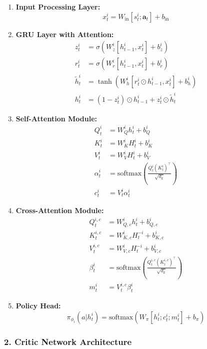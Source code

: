 \begin{enumerate}
\item \textbf{Input Processing Layer:}
   \[
   x_t^i = W_{\text{in}}[s_t^i; \mathbf{a}_t] + b_{\text{in}}
   \]

\item \textbf{GRU Layer with Attention:}
   \begin{align*}
   z_t^i &= \sigma(W_z^i[h_{t-1}^i, x_t^i] + b_z^i) \\
   r_t^i &= \sigma(W_r^i[h_{t-1}^i, x_t^i] + b_r^i) \\
   \tilde{h}_t^i &= \tanh(W_h^i[r_t^i \odot h_{t-1}^i, x_t^i] + b_h^i) \\
   h_t^i &= (1-z_t^i) \odot h_{t-1}^i + z_t^i \odot \tilde{h}_t^i
   \end{align*}

\item \textbf{Self-Attention Module:}
   \begin{align*}
   Q_t^i &= W_Q^i h_t^i + b_Q^i \\
   K_t^i &= W_K^i H_t^i + b_K^i \\
   V_t^i &= W_V^i H_t^i + b_V^i \\
   \alpha_t^i &= \text{softmax}\left(\frac{Q_t^i(K_t^i)^\top}{\sqrt{d_k}}\right) \\
   c_t^i &= V_t^i\alpha_t^i
   \end{align*}

\item \textbf{Cross-Attention Module:}
   \begin{align*}
   Q_t^{i,c} &= W_{Q,c}^i h_t^i + b_{Q,c}^i \\
   K_t^{i,c} &= W_{K,c}^i H_t^{-i} + b_{K,c}^i \\
   V_t^{i,c} &= W_{V,c}^i H_t^{-i} + b_{V,c}^i \\
   \beta_t^i &= \text{softmax}\left(\frac{Q_t^{i,c}(K_t^{i,c})^\top}{\sqrt{d_k}}\right) \\
   m_t^i &= V_t^{i,c}\beta_t^i
   \end{align*}

\item \textbf{Policy Head:}
   \[
   \pi_{\phi_i}(a|h_t^i) = \text{softmax}(W_\pi[h_t^i; c_t^i; m_t^i] + b_\pi)
   \]
\end{enumerate}

\subsubsection*{2. Critic Network Architecture}

